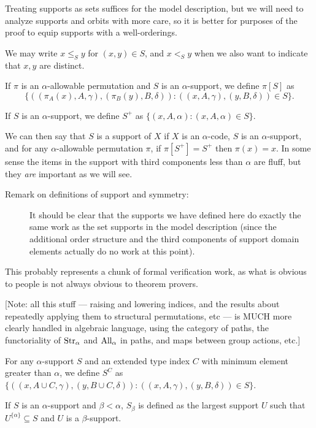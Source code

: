 Treating supports as sets suffices for the model description, but we will need to analyze supports and orbits with more care, so it is better for purposes
of the proof to equip supports with a well-orderings.

We may write $x \leq_S y$ for $(x,y) \in S$, and $x <_S y$ when we also want to indicate that $x,y$ are distinct.

If $\pi$ is an $\alpha$-allowable permutation and $S$ is an $\alpha$-support, we define $\pi[S]$ as $$\{((\pi_A(x),A,\gamma),(\pi_B(y),B,\delta)):((x,A,\gamma),(y,B,\delta))\in S\}.$$

If $S$ is an $\alpha$-support, we define $S^+$ as $\{(x,A,\alpha):(x,A,\alpha) \in S\}$.

We can then say that $S$ is a support of $X$ if $X$ is an $\alpha$-code, $S$ is an $\alpha$-support, and for any $\alpha$-allowable permutation $\pi$, if $\pi[S^+]=S^+$ then $\pi(x)=x$.  In some sense the items in the support with third components less than $\alpha$ are fluff, but they {\em are\/} important as we will see.

\begin{description}
\item[Remark on definitions of support and symmetry:]  It should be clear that the supports we have defined here do exactly the same work as the set supports in the model description (since the additional order structure and the third components of support domain elements actually do no work at this point).
\end{description}

This probably represents a chunk of formal verification work, as what is obvious to people is not always obvious to theorem provers.

\begin{definition}
\label {def:raise-lower-index}
[Note: all this stuff — raising and lowering indices, and the results about repeatedly applying them to structural permutations, etc — is MUCH more clearly handled in algebraic language, using the category of paths, the functoriality of $\mathrm{Str}_\alpha$ and $\mathrm{All}_\alpha$ in paths, and maps between group actions, etc.]

For any $\alpha$-support $S$ and an extended type index $C$ with minimum element greater than $\alpha$, we define $S^C$ as
$\{((x,A\cup C,\gamma),(y,B\cup C,\delta)):((x,A,\gamma),(y,B,\delta)) \in S\}$.

If $S$ is an $\alpha$-support and $\beta<\alpha$, $S_\beta$ is defined as the largest support $U$ such that $U^{\{\alpha\}} \subseteq S$ and $U$ is a $\beta$-support.
\end{definition}


